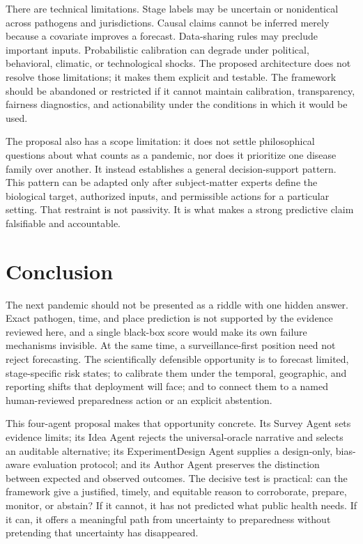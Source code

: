 \documentclass[conference]{IEEEtran}
\begin{document}
There are technical limitations. Stage labels may be uncertain or nonidentical across pathogens and jurisdictions. Causal claims cannot be inferred merely because a covariate improves a forecast. Data-sharing rules may preclude important inputs. Probabilistic calibration can degrade under political, behavioral, climatic, or technological shocks. The proposed architecture does not resolve those limitations; it makes them explicit and testable. The framework should be abandoned or restricted if it cannot maintain calibration, transparency, fairness diagnostics, and actionability under the conditions in which it would be used.

The proposal also has a scope limitation: it does not settle philosophical questions about what counts as a pandemic, nor does it prioritize one disease family over another. It instead establishes a general decision-support pattern. This pattern can be adapted only after subject-matter experts define the biological target, authorized inputs, and permissible actions for a particular setting. That restraint is not passivity. It is what makes a strong predictive claim falsifiable and accountable.

\section{Conclusion}

The next pandemic should not be presented as a riddle with one hidden answer. Exact pathogen, time, and place prediction is not supported by the evidence reviewed here, and a single black-box score would make its own failure mechanisms invisible. At the same time, a surveillance-first position need not reject forecasting. The scientifically defensible opportunity is to forecast limited, stage-specific risk states; to calibrate them under the temporal, geographic, and reporting shifts that deployment will face; and to connect them to a named human-reviewed preparedness action or an explicit abstention.

This four-agent proposal makes that opportunity concrete. Its Survey Agent sets evidence limits; its Idea Agent rejects the universal-oracle narrative and selects an auditable alternative; its ExperimentDesign Agent supplies a design-only, bias-aware evaluation protocol; and its Author Agent preserves the distinction between expected and observed outcomes. The decisive test is practical: can the framework give a justified, timely, and equitable reason to corroborate, prepare, monitor, or abstain? If it cannot, it has not predicted what public health needs. If it can, it offers a meaningful path from uncertainty to preparedness without pretending that uncertainty has disappeared.
\end{document}
